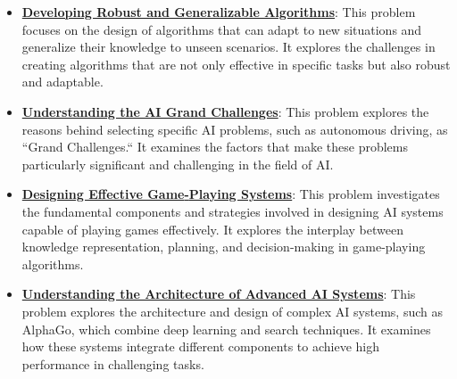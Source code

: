 \documentclass{article}%
\begin{document}
\begin{itemize}[leftmargin=*]
\item \href{https://purdue.brightspace.com/d2l/common/assets/pdfjs-d2l-dist/1.0.14-legacy/web/viewer.html?file=\%2Fcontent\%2Fenforced\%2F1095467-wl.202510.CS.24300.001\%2F02L2-Intro.pdf\%3Fou\%3D1095467\&lang=en-us\&container=d2l-fileviewer-rendered-pdf\&fullscreen=d2l-fileviewer-rendered-pdf-dialog\&height=667#page=36}{\textbf{Developing Robust and Generalizable Algorithms}}: This problem focuses on the design of algorithms that can adapt to new situations and generalize their knowledge to unseen scenarios. It explores the challenges in creating algorithms that are not only effective in specific tasks but also robust and adaptable.%
\item \href{https://purdue.brightspace.com/d2l/common/assets/pdfjs-d2l-dist/1.0.14-legacy/web/viewer.html?file=\%2Fcontent\%2Fenforced\%2F1095467-wl.202510.CS.24300.001\%2F02L2-Intro.pdf\%3Fou\%3D1095467\&lang=en-us\&container=d2l-fileviewer-rendered-pdf\&fullscreen=d2l-fileviewer-rendered-pdf-dialog\&height=667#page=43}{\textbf{Understanding the AI Grand Challenges}}: This problem explores the reasons behind selecting specific AI problems, such as autonomous driving, as ``Grand Challenges.``  It examines the factors that make these problems particularly significant and challenging in the field of AI.%
\item \href{https://purdue.brightspace.com/d2l/common/assets/pdfjs-d2l-dist/1.0.14-legacy/web/viewer.html?file=\%2Fcontent\%2Fenforced\%2F1095467-wl.202510.CS.24300.001\%2F02L2-Intro.pdf\%3Fou\%3D1095467\&lang=en-us\&container=d2l-fileviewer-rendered-pdf\&fullscreen=d2l-fileviewer-rendered-pdf-dialog\&height=667#page=47}{\textbf{Designing Effective Game{-}Playing Systems}}: This problem investigates the fundamental components and strategies involved in designing AI systems capable of playing games effectively. It explores the interplay between knowledge representation, planning, and decision-making in game-playing algorithms.%
\item \href{https://purdue.brightspace.com/d2l/common/assets/pdfjs-d2l-dist/1.0.14-legacy/web/viewer.html?file=\%2Fcontent\%2Fenforced\%2F1095467-wl.202510.CS.24300.001\%2F02L2-Intro.pdf\%3Fou\%3D1095467\&lang=en-us\&container=d2l-fileviewer-rendered-pdf\&fullscreen=d2l-fileviewer-rendered-pdf-dialog\&height=667#page=50}{\textbf{Understanding the Architecture of Advanced AI Systems}}: This problem explores the architecture and design of complex AI systems, such as AlphaGo, which combine deep learning and search techniques. It examines how these systems integrate different components to achieve high performance in challenging tasks.%
\end{itemize}%
\end{document}
